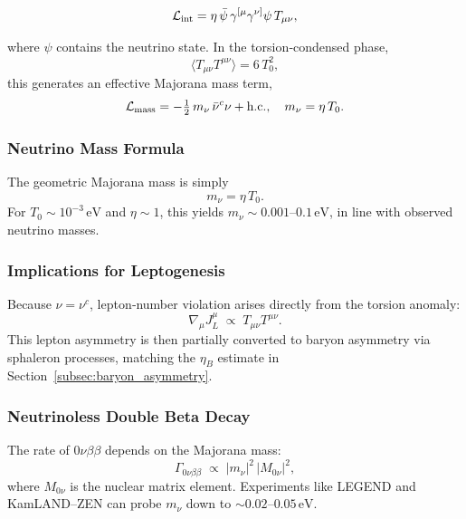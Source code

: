 \documentclass{article}
\begin{document}
\begin{equation}
  \mathcal L_{\rm int}
  = \eta\,\bar\psi\,\gamma^{[\mu}\gamma^{\nu]}\psi\,T_{\mu\nu},
\end{equation}

where \(\psi\) contains the neutrino state.  In the torsion‐condensed phase,
\begin{equation}\label{eq:auto135}
\bigl\langle T_{\mu\nu}T^{\mu\nu}\bigr\rangle
    = 6\,T_0^2,
\end{equation}
this generates an effective Majorana mass term,
\begin{equation}\label{eq:auto136}
\mathcal L_{\rm mass}
  = -\tfrac12\,m_\nu\,\bar\nu^c\nu
    + \text{h.c.}, 
  \quad
  m_\nu = \eta\,T_0.
\end{equation}

\subsubsection{ Neutrino Mass Formula}
The geometric Majorana mass is simply
\begin{equation}\label{eq:auto137}
\boxed{m_\nu = \eta\,T_0}.
\end{equation}
For \(T_0\sim10^{-3}\,\mathrm{eV}\) and \(\eta\sim1\), this yields
\(m_\nu\sim0.001\)–\(0.1\,\mathrm{eV}\), in line with observed neutrino masses.

\subsubsection{ Implications for Leptogenesis}
Because \(\nu=\nu^c\), lepton‐number violation arises directly from the torsion
anomaly:
\begin{equation}\label{eq:auto138}
\nabla_\mu J_L^\mu
  \;\propto\;
    T_{\mu\nu}T^{\mu\nu}.
\end{equation}
This lepton asymmetry is then partially converted to baryon asymmetry via
sphaleron processes, matching the \(\eta_B\) estimate in Section~\ref{subsec:baryon_asymmetry}.

\subsubsection{ Neutrinoless Double Beta Decay}
The rate of \(0\nu\beta\beta\) depends on the Majorana mass:
\begin{equation}\label{eq:auto139}
\Gamma_{0\nu\beta\beta}
  \;\propto\; |m_\nu|^2\,|M_{0\nu}|^2,
\end{equation}
where \(M_{0\nu}\) is the nuclear matrix element.  Experiments like LEGEND
and KamLAND–ZEN can probe \(m_\nu\) down to \(\sim0.02\)–\(0.05\,\mathrm{eV}\).
\end{document}
